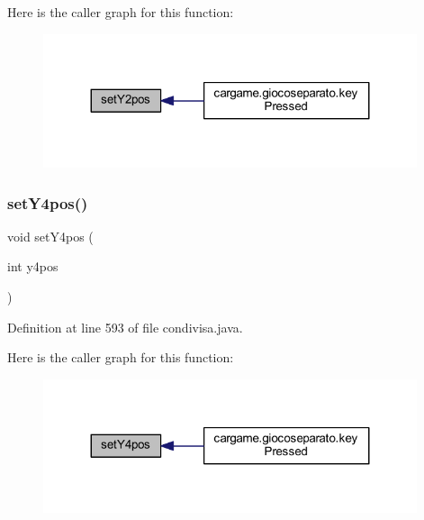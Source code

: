Here is the caller graph for this function\+:
\nopagebreak
\begin{figure}[H]
\begin{center}
\leavevmode
\includegraphics[width=311pt]{classcargame_1_1condivisa_a596efa01b731811ef9e80909f32af69e_icgraph}
\end{center}
\end{figure}
\mbox{\label{classcargame_1_1condivisa_a76b00ce7ba6b0f81a10fc9f4850a9233}} 
\subsubsection{\texorpdfstring{set\+Y4pos()}{setY4pos()}}
{\footnotesize\ttfamily void set\+Y4pos (\begin{DoxyParamCaption}\item[{int}]{y4pos }\end{DoxyParamCaption})}



Definition at line 593 of file condivisa.\+java.

Here is the caller graph for this function\+:
\nopagebreak
\begin{figure}[H]
\begin{center}
\leavevmode
\includegraphics[width=311pt]{classcargame_1_1condivisa_a76b00ce7ba6b0f81a10fc9f4850a9233_icgraph}
\end{center}
\end{figure}
\mbox{\label{classcargame_1_1condivisa_a3c187905ecd13a93abdacba7bf7b3176}} 
